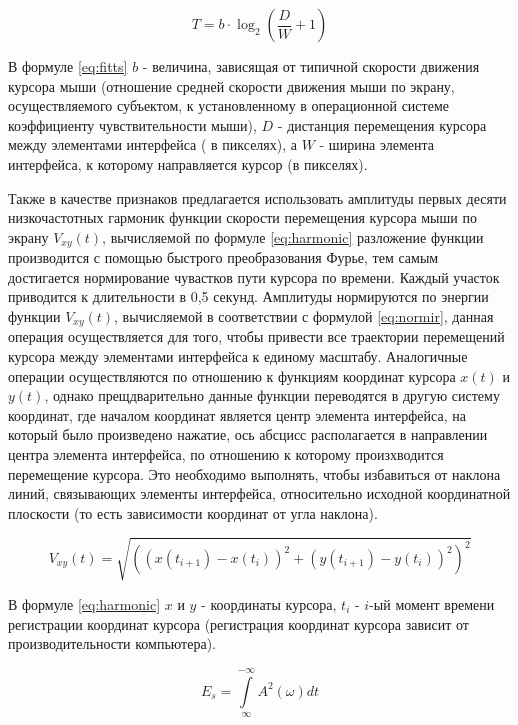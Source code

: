 \begin{equation}
\label{eq:fitts}
T = b \cdot \log_{2}(\frac{D}{W} + 1)
\end{equation}

В формуле \ref{eq:fitts} $b$ - величина, зависящая от типичной скорости движения курсора мыши (отношение средней скорости движения мыши по экрану, осуществляемого субъектом, к установленному в операционной системе коэффициенту чувствительности мыши), $D$ - дистанция перемещения курсора между элементами интерфейса ( в пикселях), а $W$ - ширина элемента интерфейса, к которому направляется курсор (в пикселях).

Также в качестве признаков предлагается использовать амплитуды первых десяти низкочастотных гармоник функции скорости перемещения курсора мыши по экрану $V_{xy}(t)$, вычисляемой по формуле \ref{eq:harmonic} разложение функции производится с помощью быстрого преобразования Фурье, тем самым достигается нормирование чувастков пути курсора по времени. Каждый участок приводится к длительности в 0,5 секунд. Амплитуды нормируются по энергии функции $V_{xy}(t)$, вычисляемой в соответствии с формулой \ref{eq:normir}, данная операция осуществляется для того, чтобы привести все траектории перемещений курсора между элементами интерфейса к единому масштабу. Аналогичные операции осуществляются по отношению к функциям координат курсора $x(t)$ и $y(t)$, однако прещдварительно данные функции переводятся в другую систему координат, где началом координат является центр элемента интерфейса, на который было произведено нажатие, ось абсцисс располагается в направлении центра элемента интерфейса, по отношению к которому произхводится перемещение курсора. Это необходимо выполнять, чтобы избавиться от наклона линий, связывающих элементы интерфейса, относительно исходной координатной плоскости (то есть зависимости координат от угла наклона). \cite{mouseMethod}

\begin{equation}
\label{eq:harmonic}
V_{xy}(t) = \sqrt{((x(t_{i+1}) - x(t_i))^2 + (y(t_{i+1})-y(t_i))^2)^2}
\end{equation}

В формуле \ref{eq:harmonic} $x$ и $y$ - координаты курсора, $t_i$ - $i$-ый момент времени регистрации координат курсора (регистрация координат курсора зависит от производительности компьютера).

\begin{equation}
\label{eq:normir}
E_s = \int\limits_{\infty}^{-\infty} A^2(\omega)dt
\end{equation}

